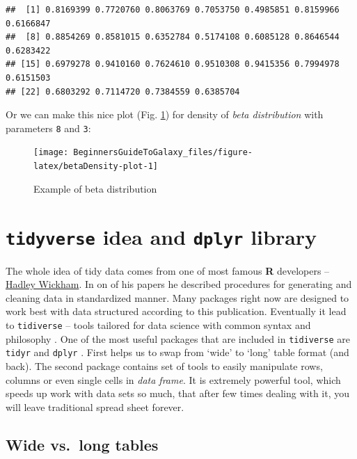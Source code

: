 \documentclass[]{book}
\theoremstyle{definition}
\theoremstyle{definition}
\theoremstyle{definition}
\theoremstyle{remark}
\begin{document}
\begin{verbatim}
##  [1] 0.8169399 0.7720760 0.8063769 0.7053750 0.4985851 0.8159966 0.6166847
##  [8] 0.8854269 0.8581015 0.6352784 0.5174108 0.6085128 0.8646544 0.6283422
## [15] 0.6979278 0.9410160 0.7624610 0.9510308 0.9415356 0.7994978 0.6151503
## [22] 0.6803292 0.7114720 0.7384559 0.6385704
\end{verbatim}

Or we can make this nice plot (Fig. \ref{fig:betaDensity-plot}) for
density of \emph{beta distribution} with parameters \texttt{8} and
\texttt{3}:

\begin{figure}

{\centering \texttt{[image: BeginnersGuideToGalaxy\_files/figure-latex/betaDensity-plot-1]} 

}

\caption{Example of beta distribution}\label{fig:betaDensity-plot}
\end{figure}

\section{\texorpdfstring{\texttt{tidyverse} idea and \texttt{dplyr}
library}{tidyverse idea and dplyr library}}\label{tidyverse-idea-and-dplyr-library}

The whole idea of tidy data comes from one of most famous \textbf{R}
developers -- \href{http://hadley.nz/}{Hadley Wickham}. In on of his
papers \citep{hadley2014} he described procedures for generating and
cleaning data in standardized manner. Many packages right now are
designed to work best with data structured according to this
publication. Eventually it lead to \texttt{tidiverse} -- tools tailored
for data science with common syntax and philosophy \citep{R-tidyverse}.
One of the most useful packages that are included in \texttt{tidiverse}
\citep{R-tidyverse} are \texttt{tidyr} \citep{R-tidyr} and
\texttt{dplyr} \citep{R-dplyr}. First helps us to swap from `wide' to
`long' table format (and back). The second package contains set of tools
to easily manipulate rows, columns or even single cells in \emph{data
frame}. It is extremely powerful tool, which speeds up work with data
sets so much, that after few times dealing with it, you will leave
traditional spread sheet forever.

\subsection{Wide vs.~long tables}\label{wide-vs.long-tables}
\end{document}
